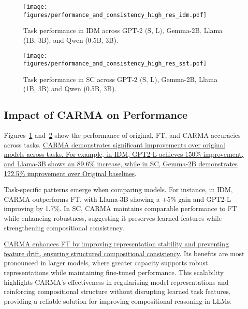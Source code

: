 \begin{figure}[h!]
    \centering
    \texttt{[image: figures/performance\_and\_consistency\_high\_res\_idm.pdf]}
    \caption{Task performance in IDM across GPT-2 (S, L), Gemma-2B, Llama (1B, 3B), and Qwen (0.5B, 3B).}
    \label{fig:idm_performance_comparison}
\end{figure}
\begin{figure}[h!]
    \centering
    \texttt{[image: figures/performance\_and\_consistency\_high\_res\_sst.pdf]}
    \caption{Task performance in SC across GPT-2 (S, L), Gemma-2B, Llama (1B, 3B) and Qwen (0.5B, 3B).}
    \label{fig:sst_performance_comparison}
\end{figure}



\subsection{Impact of CARMA on Performance}\label{sec:carma_performance}
Figures~\ref{fig:idm_performance_comparison} and~\ref{fig:sst_performance_comparison} show the performance of original, FT, and CARMA accuracies across tasks. \ul{CARMA demonstrates significant improvements over original models across tasks. For example, in IDM, GPT2-L achieves 150\% improvement, and Llama-3B shows an 89.6\% increase, while in SC, Gemma-2B demonstrates 122.5\% improvement over Original baselines}.

Task-specific patterns emerge when comparing models. For instance, in IDM, CARMA outperforms FT, with Llama-3B showing a +5\% gain and GPT2-L improving by 1.7\%. In SC, CARMA maintains comparable performance to FT while enhancing robustness, suggesting it preserves learned features while strengthening compositional consistency.

\ul{CARMA enhances FT by improving representation stability and preventing feature drift, ensuring structured compositional consistency}. Its benefits are most pronounced in larger models, where greater capacity supports robust representations while maintaining fine-tuned performance. This scalability highlights CARMA's effectiveness in regularising model representations and reinforcing compositional structure without disrupting learned task features, providing a reliable solution for improving compositional reasoning in LLMs.

